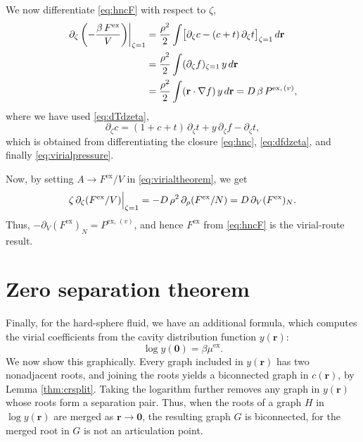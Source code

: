 \documentclass[preprint]{revtex4-1}
\newcommand{\vct}[1]{\mathbf{#1}}
\providecommand{\vr}{} %
\renewcommand{\vr}{\vct{r}}
\newcommand{\supex}[1]{ { { #1 }^{ \mathrm{ex} } } }
\newcommand{\supexv}[1]{ { { #1 }^{ \mathrm{ex}, \, (v) } } }
\newcommand{\Pex}{\supex{P}}
\newcommand{\Pexv}{\supexv{P}}
\newcommand{\Fex}{\supex{F}}
\newcommand{\muex}{\supex{\mu}}
\begin{document}
We now differentiate \eqref{eq:hncF} with respect to $\zeta$,
\begin{align}
  \left. \partial_\zeta \left(-\frac{ \beta\,\Fex }{ V }\right) \right|_{\zeta = 1}
&=
\frac{\rho^2}{2} \int
  \bigl[
    \partial_\zeta c - (c + t) \, \partial_\zeta t
  \bigr]_{\zeta = 1} \, d\vr
  \notag \\
&= \frac{\rho^2}{2} \int (\partial_\zeta f)_{\zeta = 1} \, y \, d\vr
  \notag \\
&= \frac{\rho^2}{2} \int (\vr \cdot \nabla f) \, y \, d\vr
= D \, \beta \, \Pexv,
  \notag
\end{align}
%
where we have used \eqref{eq:dTdzeta},
\[
  \partial_\zeta c
  = (1 + c + t) \, \partial_\zeta t
  + y \, \partial_\zeta f - \partial_\zeta t,
\]
which is obtained from differentiating the closure \eqref{eq:hnc},
\eqref{eq:dfdzeta}, and finally \eqref{eq:virialpressure}.

Now, by setting $A \rightarrow \Fex / V$ in \eqref{eq:virialtheorem}, we get
\begin{align}
  \zeta \, \partial_\zeta (\Fex/V) \Big|_{\zeta = 1}
  = -D \, \rho^2 \, \partial_\rho (\Fex/N)
  = D \, \partial_V (\Fex)_N.
    \notag %
\end{align}
Thus, $-\partial_V (\Fex)_N = \Pexv$,
and hence $\Fex$ from \eqref{eq:hncF} is the virial-route result.
%





\section{Zero separation theorem}

Finally, for the hard-sphere fluid, we have an additional formula,
  which computes the virial coefficients
  from the cavity distribution function $y(\vr)$\cite{hoover1962}:
%
\begin{equation}
  \log y(\vct0) = \beta \muex.
  \label{eq:yrzerosep}
\end{equation}
%
We now show this graphically.
%
Every graph included in $y(\vr)$
  has two nonadjacent roots\cite{hansen},
%
  and joining the roots
  yields a biconnected graph in $c(\vr)$,
  by Lemma \ref{thm:crsplit}.
%
Taking the logarithm further
  removes any graph in $y(\vr)$
  whose roots form
  a separation pair\cite{hansen}.
%
Thus, when the roots of a graph $H$ in $\log y(\vr)$
  are merged as $\vr \rightarrow \vct0$,
  the resulting graph $G$ is biconnected,
  for the merged root in $G$ is not an articulation point.
\end{document}
